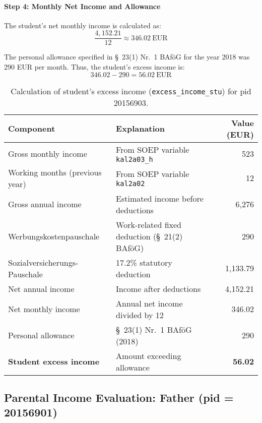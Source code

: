 \paragraph{Step 4: Monthly Net Income and Allowance}
The student’s net monthly income is calculated as:
\[
\frac{4{,}152.21}{12} \approx 346.02~\text{EUR}
\]

The personal allowance specified in §~23(1) Nr.~1 BAföG for the year 2018 was 290 EUR per month. Thus, the student’s excess income is:
\[
346.02 - 290 = 56.02~\text{EUR}
\]

\begin{table}[H]
\scriptsize
\centering
\begin{tabular}{llr}
\toprule
\textbf{Component} & \textbf{Explanation} & \textbf{Value (EUR)} \\
\midrule
Gross monthly income & From SOEP variable \texttt{kal2a03\_h} & 523 \\
Working months (previous year) & From SOEP variable \texttt{kal2a02} & 12 \\
\midrule
Gross annual income & Estimated income before deductions & 6,276 \\
\midrule
Werbungskostenpauschale & Work-related fixed deduction (§~21(2) BAföG) & 290 \\
Sozialversicherungs-Pauschale & 17.2\% statutory deduction & 1,133.79 \\
\midrule
Net annual income & Income after deductions & 4,152.21 \\
Net monthly income & Annual net income divided by 12 & 346.02 \\
\midrule
Personal allowance & §~23(1) Nr.~1 BAföG (2018) & 290 \\
\midrule
\textbf{Student excess income} & Amount exceeding allowance & \textbf{56.02} \\
\bottomrule
\end{tabular}
\caption{Calculation of student’s excess income (\texttt{excess\_income\_stu}) for pid 20156903.}
\label{table:bafoeg_excess_income_stu}
\end{table}



\subsection{Parental Income Evaluation: Father (pid = 20156901)}

